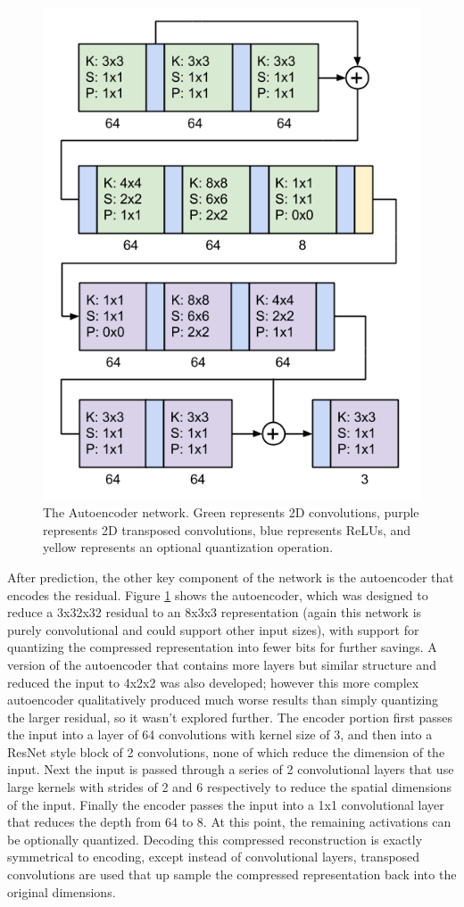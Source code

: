 \documentclass[10pt,twocolumn,letterpaper]{article}
\begin{document}
\begin{figure}[t]
\begin{center}
  \includegraphics[width=0.8\linewidth]{auto}
\end{center}
   \caption{The Autoencoder network. Green represents 2D convolutions, purple represents 2D transposed convolutions, blue represents ReLUs, and yellow represents an optional quantization operation.}
   \label{fig:auto}
\end{figure}

  After prediction, the other key component of the network is the autoencoder that encodes the residual. Figure \ref{fig:auto} shows the autoencoder, which was designed to reduce a 3x32x32 residual to an 8x3x3 representation (again this network is purely convolutional and could support other input sizes), with support for quantizing the compressed representation into fewer bits for further savings. A version of the autoencoder that contains more layers but similar structure and reduced the input to 4x2x2 was also developed; however this more complex autoencoder qualitatively produced much worse results than simply quantizing the larger residual, so it wasn't explored further. The encoder portion first passes the input into a layer of 64 convolutions with kernel size of 3, and then into a ResNet style block of 2 convolutions, none of which reduce the dimension of the input. Next the input is passed through a series of 2 convolutional layers that use large kernels with strides of 2 and 6 respectively to reduce the spatial dimensions of the input. Finally the encoder passes the input into a 1x1 convolutional layer that reduces the depth from 64 to 8. At this point, the remaining activations can be optionally quantized. Decoding this compressed reconstruction is exactly symmetrical to encoding, except instead of convolutional layers, transposed convolutions are used that up sample the compressed representation back into the original dimensions.
\end{document}
